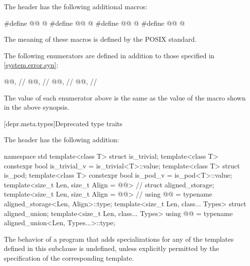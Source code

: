 \pnum
The header  has the following additional macros:

\begin{codeblock}
#define @@ @\seebelow@
#define @@ @\seebelow@
#define @@ @\seebelow@
#define @@ @\seebelow@
\end{codeblock}

\pnum
The meaning of these macros is defined by the POSIX standard.

\pnum
The following  enumerators are defined
in addition to those specified in \ref{system.error.syn}:

\begin{codeblock}
@@,               // 
@@,                // 
@@,                       // 
@@,                     // 
\end{codeblock}

\pnum
The value of each  enumerator above
is the same as the value of the  macro
shown in the above synopsis.

[depr.meta.types]{Deprecated type traits}

\pnum
The header 
has the following addition:

\begin{codeblock}
namespace std {
  template<class T> struct is_trivial;
  template<class T> constexpr bool is_trivial_v = is_trivial<T>::value;
  template<class T> struct is_pod;
  template<class T> constexpr bool is_pod_v = is_pod<T>::value;
  template<size_t Len, size_t Align = @@> // \seebelow
    struct aligned_storage;
  template<size_t Len, size_t Align = @@> // \seebelow
    using @@ = typename aligned_storage<Len, Align>::type;
  template<size_t Len, class... Types>
    struct aligned_union;
  template<size_t Len, class... Types>
    using @@ = typename aligned_union<Len, Types...>::type;
}
\end{codeblock}

\pnum
The behavior of a program that adds specializations for
any of the templates defined in this subclause is undefined,
unless explicitly permitted by the specification of the corresponding template.

